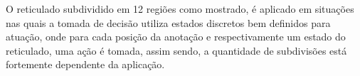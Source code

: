 O reticulado subdividido em 12 regiões como mostrado, é aplicado em situações nas quais a tomada de decisão utiliza estados discretos bem definidos para atuação, onde para cada posição da anotação e respectivamente um estado do reticulado, uma ação é tomada, assim sendo, a quantidade de subdivisões está fortemente dependente da aplicação.













